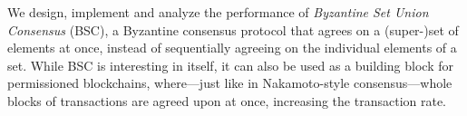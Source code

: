 \begin{samepage}
We design, implement and analyze the performance of \emph{Byzantine Set Union
Consensus} (BSC), a Byzantine consensus protocol that agrees on a (super-)set
of elements at once, instead of sequentially agreeing on the individual
elements of a set.  While BSC is interesting in itself, it can also be used as
a building block for permissioned blockchains, where---just like in
Nakamoto-style consensus---whole blocks of transactions are agreed upon at once,
increasing the transaction rate.
\end{samepage}
